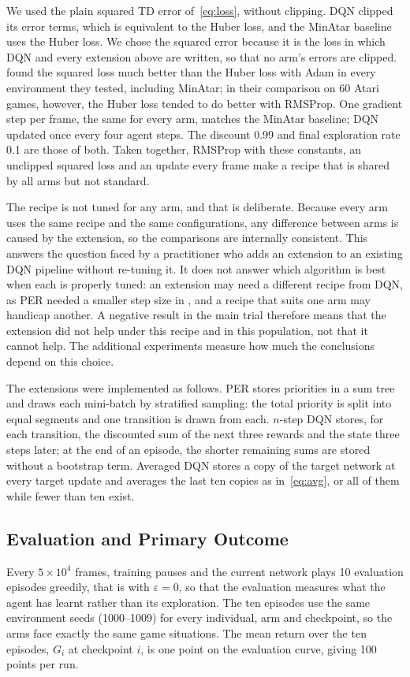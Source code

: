 \documentclass[conference,a4paper]{IEEEtran}
\begin{document}
We used the plain squared TD error of~\eqref{eq:loss}, without clipping. DQN clipped its error terms, which is
equivalent to the Huber loss, and the MinAtar baseline uses the Huber loss. We chose the squared error because it is
the loss in which DQN and every extension above are written, so that no arm's errors are clipped.
\citet{obandoceron2021revisiting} found the squared loss much better than the Huber loss with Adam in every
environment they tested, including MinAtar; in their comparison on 60 Atari games, however, the Huber loss tended to do
better with RMSProp. One gradient step per frame, the same for
every arm, matches the MinAtar baseline; DQN updated once every four agent steps. The discount 0.99 and final
exploration rate 0.1 are those of both. Taken together, RMSProp with these constants, an unclipped squared loss and an
update every frame make a recipe that is shared by all arms but not standard.

The recipe is not tuned for any arm, and that is deliberate. Because every arm uses the same recipe and the same
configurations, any difference between arms is caused by the extension, so the comparisons are internally consistent.
This answers the question faced by a practitioner who adds an extension to an existing DQN pipeline without re-tuning
it. It does not answer which algorithm is best when each is properly tuned: an extension may need a different recipe
from DQN, as PER needed a smaller step size in \citet{schaul2016prioritized}, and a recipe that suits one arm may
handicap another. A negative result in the main trial therefore means that the extension did not help under this
recipe and in this population, not that it cannot help. The additional experiments measure how much the conclusions
depend on this choice.

The extensions were implemented as follows. PER stores priorities in a sum tree and draws each mini-batch by
stratified sampling: the total priority is split into equal segments and one transition is drawn from each.
$n$-step DQN stores, for each transition, the discounted sum of the next three rewards and the state three steps later;
at the end of an episode, the shorter remaining sums are stored without a bootstrap term. Averaged DQN stores a copy of
the target network at every target update and averages the last ten copies as in~\eqref{eq:avg}, or all of them while
fewer than ten exist.

\subsection{Evaluation and Primary Outcome}
Every $5\times10^{4}$ frames, training pauses and the current network plays 10 evaluation episodes greedily, that is
with $\varepsilon=0$, so that the evaluation measures what the agent has learnt rather than its exploration. The ten
episodes use the same environment seeds (1000--1009) for every individual, arm and checkpoint, so the arms face exactly
the same game situations. The mean return over the ten episodes, $G_i$ at checkpoint $i$, is one point on the
evaluation curve, giving 100 points per run.
\end{document}
